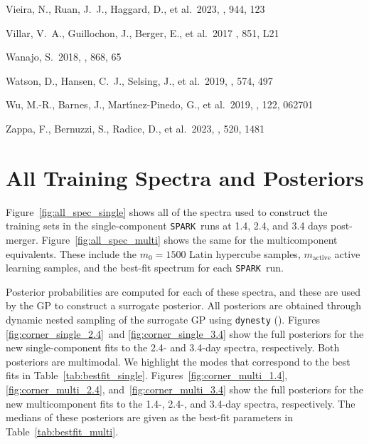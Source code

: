 \documentclass[twocolumn,twocolappendix]{aastex63}
\def\SPARK{\texttt{SPARK}}
\begin{document}
{{{{{{{{\begin{thebibliography}{}
 Vieira, N., Ruan, J.~J., Haggard, D., et al.\ 2023, \apj, 944, 123


Villar, V.~A., Guillochon, J., Berger, E., et al.\ 2017 \aj, 851, L21


 Wanajo, S.\ 2018, \apj, 868, 65


 Watson, D., Hansen, C.~J., Selsing, J., et al.\ 2019, \nat, 574, 497


 Wu, M.-R., Barnes, J., Mart{\'\i}nez-Pinedo, G., et al.\ 2019, \prl, 122, 062701


 Zappa, F., Bernuzzi, S., Radice, D., et al.\ 2023, \mnras, 520, 1481


\end{thebibliography}


\appendix{}

\section{All Training Spectra and Posteriors}\label{app:allspec_posteriors}

Figure~\ref{fig:all_spec_single} shows all of the spectra used to construct the training sets in the single-component \SPARK~runs at 1.4, 2.4, and 3.4 days post-merger. Figure~\ref{fig:all_spec_multi} shows the same for the multicomponent equivalents. These include the $m_0 = 1500$ Latin hypercube samples, $m_{\mathrm{active}}$ active learning samples, and the best-fit spectrum for each \SPARK~run.

Posterior probabilities are computed for each of these spectra, and these are used by the GP to construct a surrogate posterior. All posteriors are obtained through dynamic nested sampling of the surrogate GP using \texttt{dynesty} (\citealt{speagle20}). Figures \ref{fig:corner_single_2.4}~and \ref{fig:corner_single_3.4} show the full posteriors for the new single-component fits to the 2.4- and 3.4-day spectra, respectively. Both posteriors are multimodal. We highlight the modes that correspond to the best fits in Table~\ref{tab:bestfit_single}. Figures~\ref{fig:corner_multi_1.4}, \ref{fig:corner_multi_2.4}, and~\ref{fig:corner_multi_3.4} show the full posteriors for the new multicomponent fits to the 1.4-, 2.4-, and 3.4-day spectra, respectively. The medians of these posteriors are given as the best-fit parameters in Table~\ref{tab:bestfit_multi}. 


}}}}}}}}
\end{document}
